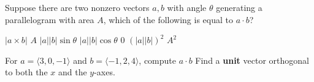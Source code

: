 \documentclass[addpoints]{exam}
\begin{document}
\begin{questions}
\question[10] Suppose there are two nonzero vectors $a,b$ with angle $\theta$ generating a parallelogram with area $A$, which of the following is equal to $a \cdot b$? 

\begin{oneparchoices}
\choice $|a \times b|$
\choice $A$
\choice $|a||b| \sin \theta$
\CorrectChoice $|a||b| \cos \theta$ 
\choice $0$
\choice $(|a||b|)^2$
\choice $A^2$
\end{oneparchoices} 
\vspace{0.5cm}
\question[25] For $a = \langle 3,0,-1 \rangle$ and $b = \langle -1, 2, 4 \rangle$, compute $a \cdot b$
\vspace{0.5cm}
\question[25] Find a {\bf unit} vector orthogonal to both the $x$ and the $y$-axes.


\end{questions}
\end{document}
